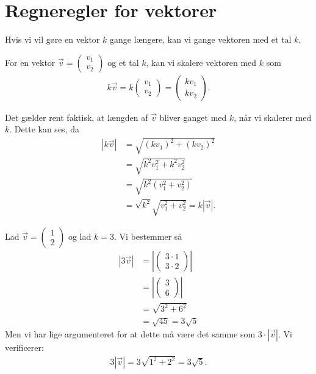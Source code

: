 \section*{Regneregler for vektorer}
Hvis vi vil gøre en vektor $k$ gange længere, kan vi gange vektoren med et tal $k$. 
\begin{defn}[Vektorskalering]
For en vektor $\vec{v} = \begin{pmatrix}
v_1\\v_2
\end{pmatrix}$ og et tal $k$, kan vi skalere vektoren med $k$ som
\begin{align*}
k\vec{v} = k\begin{pmatrix}
v_1\\v_2 
\end{pmatrix} =  \begin{pmatrix}
kv_1\\kv_2
\end{pmatrix}.
\end{align*}
\end{defn}
Det gælder rent faktisk, at længden af $\vec{v}$ bliver ganget med $k$, når vi skalerer med $k$. Dette kan ses, da
\begin{align*}
|k\vec{v}| &= \sqrt{(kv_1)^2+(kv_2)^2}\\
 &= \sqrt{k^2v_1^2 + k^2v_2^2}\\
 &= \sqrt{k^2(v_1^2+v_2^2)}\\
  &= \sqrt{k^2}\sqrt{v_1^2+v_2^2} = k|\vec{v}|.
\end{align*}
\begin{exa}
Lad $\vec{v} = \begin{pmatrix}
1\\2\end{pmatrix}$ og lad $k = 3$. Vi bestemmer så
\begin{align*}
|3\vec{v}| &= \left| \begin{pmatrix}
3 \cdot 1\\ 3\cdot 2
\end{pmatrix} \right|\\
&= \left| \begin{pmatrix}
3\\ 6
\end{pmatrix}\right|\\
 &=\sqrt{3^2+6^2} \\ &= \sqrt{45} = 3\sqrt{5}
\end{align*}
Men vi har lige argumenteret for at dette må være det samme som $3\cdot |\vec{v}|$. Vi verificerer:
\begin{align*}
3 |\vec{v}| = 3\sqrt{1^2+2^2} = 3\sqrt{5}.
\end{align*}
\end{exa}
